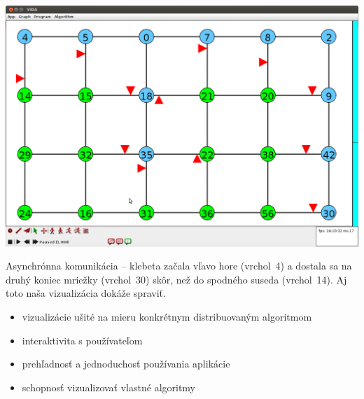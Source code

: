 \includegraphics[width=\columnwidth]{asyn}
\caption{Asynchrónna komunikácia -- klebeta začala vľavo hore (vrchol~4) a dostala sa na druhý
koniec mriežky (vrchol~30) skôr, než do spodného suseda (vrchol~14). Aj toto naša vizualizácia
dokáže spraviť. }

\begin{itemize}

    \item vizualizácie ušité na mieru konkrétnym distribuovaným algoritmom
    \item interaktivita s používateľom
    \item prehľadnosť a jednoduchosť používania aplikácie
    \item schopnosť vizualizovať vlastné algoritmy

\end{itemize}

